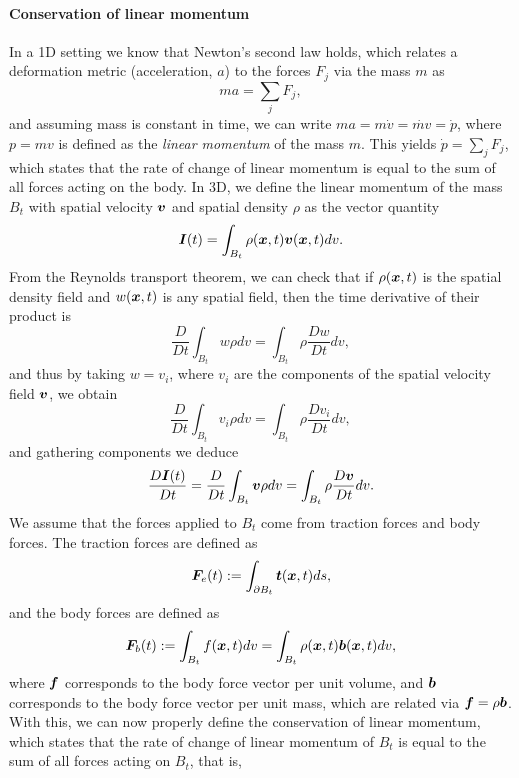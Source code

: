 \documentclass{article}
\renewcommand{\vec}{\vectorsym}
\begin{document}
\paragraph{Conservation of linear momentum} In a 1D setting we know that Newton's second law holds, which relates a deformation metric (acceleration, $a$) to the forces $F_j$ via the mass $m$ as 
\begin{equation*}
    ma = \sum_j F_j,
\end{equation*}
and assuming mass is constant in time, we can write $ma = m\dot{v} = \dot{mv} = \dot{p}$, where $p=mv$ is defined as the \textit{linear momentum} of the mass $m$. This yields $\dot{p} = \sum_j F_j$, which states that the rate of change of linear momentum is equal to the sum of all forces acting on the body. In 3D, we define the linear momentum of the mass $B_t$ with spatial velocity $\vec v$ and spatial density $\rho$ as the vector quantity
\begin{equation*}
    \vec I(t) = \int_{B_t} \rho(\vec x, t) \vec v(\vec x, t) dv.
\end{equation*}
From the Reynolds transport theorem, we can check that if $\rho(\vec x, t)$ is the spatial density field and $w(\vec x, t)$ is any spatial field, then the time derivative of their product is 
\begin{equation*}
    \frac{D}{Dt} \int_{B_t} w\rho dv = \int_{B_t} \rho \frac{Dw}{Dt} dv,
\end{equation*}
and thus by taking $w=v_i$, where $v_i$ are the components of the spatial velocity field $\vec v$, we obtain
\begin{equation*}
    \frac{D}{Dt} \int_{B_t} v_i\rho dv = \int_{B_t} \rho \frac{Dv_i}{Dt} dv,
\end{equation*}
and gathering components we deduce
\begin{equation*}
    \frac{D\vec I(t)}{Dt} = \frac{D}{Dt} \int_{B_t} \vec v \rho dv = \int_{B_t} \rho \frac{D\vec v}{Dt} dv.
\end{equation*}
We assume that the forces applied to $B_t$ come from traction forces and body forces. The traction forces are defined as 
\begin{equation*}
    \vec F_{e} (t) := \int_{\partial B_t} \vec t(\vec x, t) ds,
\end{equation*}
and the body forces are defined as 
\begin{equation*}
    \vec F_b(t) := \int_{B_t} f(\vec x, t) dv = \int_{B_t} \rho(\vec x, t) \vec b(\vec x, t)dv,
\end{equation*}
where $\vec f$ corresponds to the body force vector per unit volume, and $\vec b$ corresponds to the body force vector per unit mass, which are related via $\vec f = \rho\vec b$. With this, we can now properly define the conservation of linear momentum, which states that the rate of change of linear momentum of $B_t$ is equal to the sum of all forces acting on $B_t$, that is,
\end{document}

